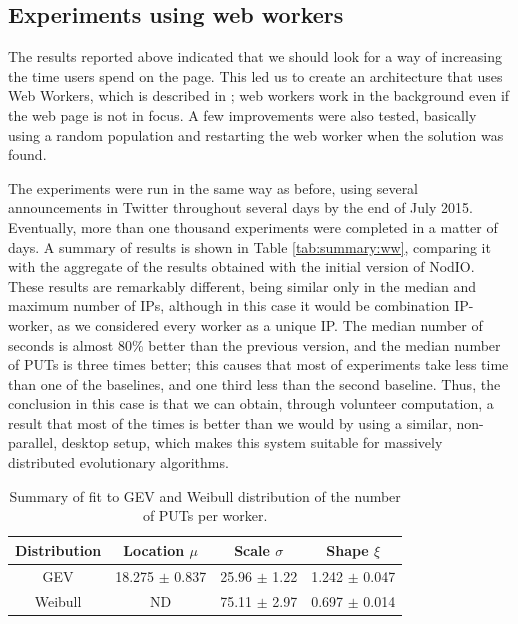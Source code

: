 \documentclass{sig-alternate}
\begin{document}
\subsection{Experiments using web workers}
\label{sec:w2}

The results reported above indicated that we should look for a way of
increasing the time users spend on the page. This led us to create an
architecture that uses Web Workers, which is described in
\cite{2016arXiv160101607Manom}; web workers work in the background even if
the web page is not in focus. A few improvements were also tested,
basically using a random population and restarting the web worker when
the solution was found.

The experiments were run in the same way as before, using several
 announcements in Twitter throughout several days by the end of July
2015. Eventually, more than one thousand experiments were completed in
a matter of days. A summary of results is shown in Table
\ref{tab:summary:ww}, comparing it with the aggregate of the results
obtained with the initial version of {\sf NodIO}. These results are
remarkably different, being similar only in the median and maximum
number of IPs, although in this case it would be combination
IP-worker, as we considered every worker as a unique IP. The median
number of seconds is almost 80\% better than the previous version, and
the median number of PUTs is three times better; this causes that most
of experiments take less time than one of the baselines, and one third
less than the second baseline. Thus, the conclusion in this case is
that we can obtain, through volunteer computation, a result that most 
of the times is better than we would by using a similar, non-parallel,
desktop setup, which makes this system suitable for massively
distributed evolutionary algorithms.
%
\begin{table}
\caption{Summary of fit to GEV and Weibull distribution of
  the number of PUTs per worker. \label{tab:puts:ww}}
\begin{center}
\begin{tabular}{cccc}
\hline
Distribution & Location $\mu$ & Scale $\sigma$ & Shape $\xi$ \\
\hline
GEV & 18.275 $\pm$ 0.837  &  25.96  $\pm$ 1.22 & 1.242   $\pm$ 0.047 \\
Weibull & ND & 75.11 $\pm$ 2.97  & 0.697 $\pm$ 0.014 \\
\hline
\end{tabular}
\end{center}
\end{table}
%
\end{document}
